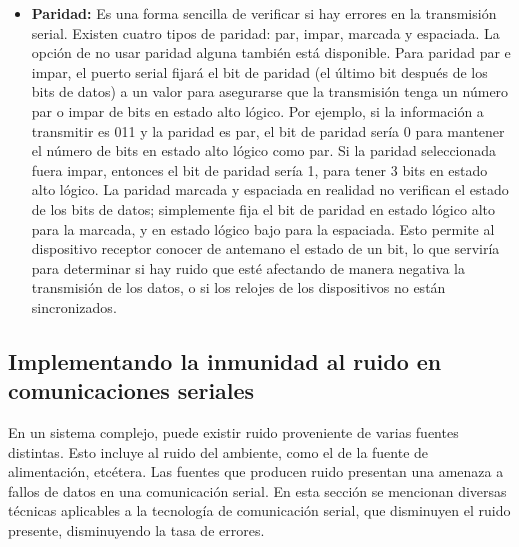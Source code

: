 \begin{itemize}
  \item \textbf{Paridad:} Es una forma sencilla de verificar si hay errores en la transmisión serial. Existen cuatro tipos de paridad: par, impar, marcada y espaciada. La opción de no usar paridad alguna también está disponible. Para paridad par e impar, el puerto serial fijará el bit de paridad (el último bit después de los bits de datos) a un valor para asegurarse que la transmisión tenga un número par o impar de bits en estado alto lógico. Por ejemplo, si la información a transmitir es 011 y la paridad es par, el bit de paridad sería 0 para mantener el número de bits en estado alto lógico como par. Si la paridad seleccionada fuera impar, entonces el bit de paridad sería 1, para tener 3 bits en estado alto lógico. La paridad marcada y espaciada en realidad no verifican el estado de los bits de datos; simplemente fija el bit de paridad en estado lógico alto para la marcada, y en estado lógico bajo para la espaciada. Esto permite al dispositivo receptor conocer de antemano el estado de un bit, lo que serviría para determinar si hay ruido que esté afectando de manera negativa la transmisión de los datos, o si los relojes de los dispositivos no están sincronizados.
\end{itemize}\cite{intro_serial}



\subsection{Implementando la inmunidad al ruido en comunicaciones seriales} %
\label{sub:implementando_la_inmunidad_al_ruido_en_comunicaciones_seriales}

En un sistema complejo, puede existir ruido proveniente de varias fuentes distintas. Esto incluye al ruido del ambiente, como el de la fuente de alimentación, etcétera. Las fuentes que producen ruido presentan una amenaza a fallos de datos en una comunicación serial. En esta sección se mencionan diversas técnicas aplicables a la tecnología de comunicación serial, que disminuyen el ruido presente, disminuyendo la tasa de errores.\cite{ruido_serial}

